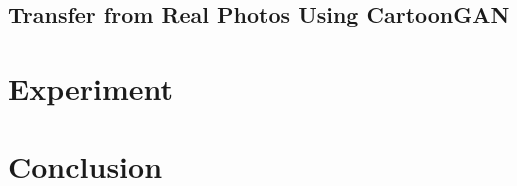 \documentclass[10pt,twocolumn,letterpaper]{article}
\begin{document}
\subsection{Transfer from Real Photos Using CartoonGAN}

\section{Experiment}

\section{Conclusion}

{\small


}
\end{document}
